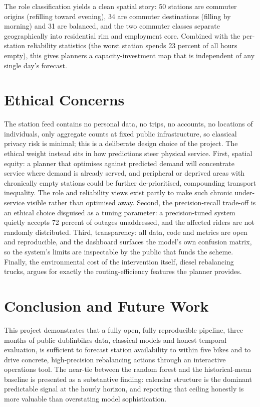 \documentclass[conference]{IEEEtran}
\begin{document}
The role classification yields a clean spatial story: 50 stations are commuter origins (refilling toward evening), 34 are commuter destinations (filling by morning) and 31 are balanced, and the two commuter classes separate geographically into residential rim and employment core. Combined with the per-station reliability statistics (the worst station spends 23 percent of all hours empty), this gives planners a capacity-investment map that is independent of any single day's forecast.

\section{Ethical Concerns}
The station feed contains no personal data, no trips, no accounts, no locations of individuals, only aggregate counts at fixed public infrastructure, so classical privacy risk is minimal; this is a deliberate design choice of the project. The ethical weight instead sits in how predictions steer physical service. First, spatial equity: a planner that optimises against predicted demand will concentrate service where demand is already served, and peripheral or deprived areas with chronically empty stations could be further de-prioritised, compounding transport inequality. The role and reliability views exist partly to make such chronic under-service visible rather than optimised away. Second, the precision-recall trade-off is an ethical choice disguised as a tuning parameter: a precision-tuned system quietly accepts 72 percent of outages unaddressed, and the affected riders are not randomly distributed. Third, transparency: all data, code and metrics are open and reproducible, and the dashboard surfaces the model's own confusion matrix, so the system's limits are inspectable by the public that funds the scheme. Finally, the environmental cost of the intervention itself, diesel rebalancing trucks, argues for exactly the routing-efficiency features the planner provides.

\section{Conclusion and Future Work}
This project demonstrates that a fully open, fully reproducible pipeline, three months of public dublinbikes data, classical models and honest temporal evaluation, is sufficient to forecast station availability to within five bikes and to drive concrete, high-precision rebalancing actions through an interactive operations tool. The near-tie between the random forest and the historical-mean baseline is presented as a substantive finding: calendar structure is the dominant predictable signal at the hourly horizon, and reporting that ceiling honestly is more valuable than overstating model sophistication.
\end{document}

